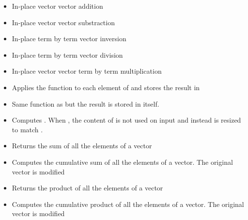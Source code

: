 \begin{itemize}
\item {} 
  \sshortdescribe In-place vector vector addition  

\item {} 
  \sshortdescribe In-place vector vector substraction  

\item {}
  \sshortdescribe In-place term by term vector inversion  

\item {} 
  \sshortdescribe In-place term by term vector division

\item {} 
  \sshortdescribe In-place vector vector term by term multiplication  

\item {} 
  \sshortdescribe Applies the function  to each element of  and
  stores the result in 

\item {}
  \sshortdescribe Same function as  but the result is
  stored in  itself.

\item {} 
  \sshortdescribe Computes . When , the content
  of  is not used on input and instead  is resized to match .

\item {}
  \sshortdescribe Returns the sum of all the elements of a vector  

\item {}
  \sshortdescribe Computes the cumulative sum of all the elements of a
  vector. The original vector is modified

\item {}
  \sshortdescribe Returns the product of all the elements of a vector  

\item {}
  \sshortdescribe Computes the cumulative product of all the elements of a
  vector. The original vector is modified
\end{itemize}

